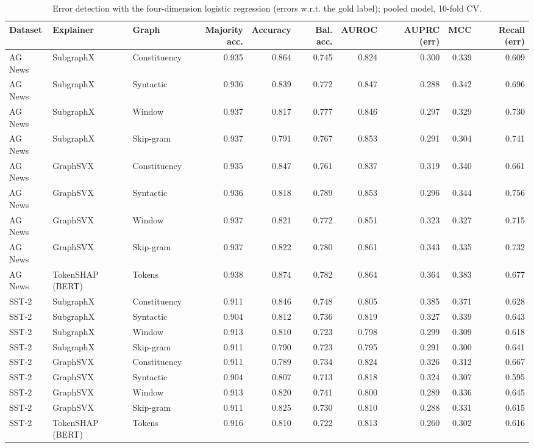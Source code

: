 \begin{table}[H]
\centering
\small
\caption{Error detection with the four-dimension logistic regression (errors w.r.t. the gold label); pooled model, 10-fold CV.}
\label{tab:lr_gold_label}
\begin{tabular}{lllrrrrrrr}
\toprule
Dataset & Explainer & Graph & Majority acc. & Accuracy & Bal. acc. & AUROC & AUPRC (err) & MCC & Recall (err) \\
\midrule
AG News & SubgraphX & Constituency & 0.935 & 0.864 & 0.745 & 0.824 & 0.300 & 0.339 & 0.609 \\
AG News & SubgraphX & Syntactic & 0.936 & 0.839 & 0.772 & 0.847 & 0.288 & 0.342 & 0.696 \\
AG News & SubgraphX & Window & 0.937 & 0.817 & 0.777 & 0.846 & 0.297 & 0.329 & 0.730 \\
AG News & SubgraphX & Skip-gram & 0.937 & 0.791 & 0.767 & 0.853 & 0.291 & 0.304 & 0.741 \\
AG News & GraphSVX & Constituency & 0.935 & 0.847 & 0.761 & 0.837 & 0.319 & 0.340 & 0.661 \\
AG News & GraphSVX & Syntactic & 0.936 & 0.818 & 0.789 & 0.853 & 0.296 & 0.344 & 0.756 \\
AG News & GraphSVX & Window & 0.937 & 0.821 & 0.772 & 0.851 & 0.323 & 0.327 & 0.715 \\
AG News & GraphSVX & Skip-gram & 0.937 & 0.822 & 0.780 & 0.861 & 0.343 & 0.335 & 0.732 \\
AG News & TokenSHAP (BERT) & Tokens & 0.938 & 0.874 & 0.782 & 0.864 & 0.364 & 0.383 & 0.677 \\
SST-2 & SubgraphX & Constituency & 0.911 & 0.846 & 0.748 & 0.805 & 0.385 & 0.371 & 0.628 \\
SST-2 & SubgraphX & Syntactic & 0.904 & 0.812 & 0.736 & 0.819 & 0.327 & 0.339 & 0.643 \\
SST-2 & SubgraphX & Window & 0.913 & 0.810 & 0.723 & 0.798 & 0.299 & 0.309 & 0.618 \\
SST-2 & SubgraphX & Skip-gram & 0.911 & 0.790 & 0.723 & 0.795 & 0.291 & 0.300 & 0.641 \\
SST-2 & GraphSVX & Constituency & 0.911 & 0.789 & 0.734 & 0.824 & 0.326 & 0.312 & 0.667 \\
SST-2 & GraphSVX & Syntactic & 0.904 & 0.807 & 0.713 & 0.818 & 0.324 & 0.307 & 0.595 \\
SST-2 & GraphSVX & Window & 0.913 & 0.820 & 0.741 & 0.800 & 0.289 & 0.336 & 0.645 \\
SST-2 & GraphSVX & Skip-gram & 0.911 & 0.825 & 0.730 & 0.810 & 0.288 & 0.331 & 0.615 \\
SST-2 & TokenSHAP (BERT) & Tokens & 0.916 & 0.810 & 0.722 & 0.813 & 0.260 & 0.302 & 0.616 \\
\bottomrule
\end{tabular}
\end{table}

